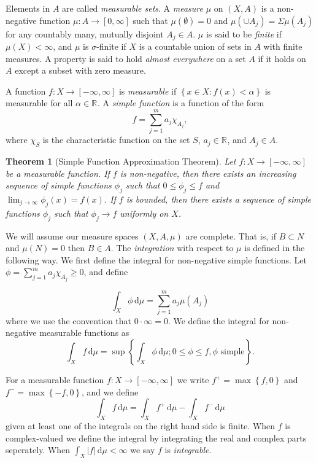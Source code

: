 \documentclass[12pt]{report}
\newtheorem{theorem}{Theorem}[section]
\numberwithin{definition}{section}
\begin{document}
Elements in $A$ are called \textit{measurable sets}.
A \textit{measure}  $\mu$ on $(X,A)$ is a non-negative function $ \mu : A \to [0,\infty] $ such that $\mu(\emptyset) = 0$ and $\mu(\cup A_{j}) = \Sigma \mu(A_{j})$ for any countably many, mutually disjoint $A_{j} \in A$.
$\mu$ is said to be  \textit{finite} if $\mu(X) < \infty$, and $\mu$ is $\sigma$-finite if $X$ is a countable union of sets in $A$ with finite measures.
A property is said to hold \textit{almost everywhere} on a set $A$ if it holds on $A$ except a subset with zero measure.

A function $ f : X \to [-\infty, \infty] $ is \textit{measurable} if $ \left\{ x \in X : f(x) < \alpha \right\}$ is measurable for all $\alpha \in \mathbb{R}^{} $.
A \textit{simple function}  is a function of the form
\[
f = \sum_{j=1}^m a_{j}\chi_{A_{j}} 
,\] 
where $\chi_{S}$ is the characteristic function on the set $S$, $a_{j} \in \mathbb{R}^{} $, and $A_{j} \in A$.

\begin{theorem}[Simple Function Approximation Theorem]
  Let $ f : X \to [-\infty, \infty] $ be a measurable function.
  If $f$ is non-negative, then there exists an increasing sequence of simple functions $\phi_{j}$ such that $0 \leq \phi_{j} \leq f$ and $\lim_{j \to \infty} \phi_{j}(x) = f(x)$.
  If $f$ is bounded, then there exists a sequence of simple functions $\phi_{j}$ such that $\phi_{j} \to f$ uniformly on $X$.
\end{theorem}

We will assume our measure spaces $(X,A,\mu)$ are complete.
That is, if $B \subset N$ and $\mu(N) = 0$ then $B \in A$.
The \textit{integration} with respect to $\mu$ is defined in the following way.
We first define the integral for non-negative simple functions.
Let $\phi = \sum_{j=1}^m a_{j} \chi_{A_{j}} \geq 0$, and define 

\[
\int_{ X} \! \phi \, \mathrm{d}\mu = \sum_{j=1}^m a_{j} \mu(A_{j})
\] 
where we use the convention that $0 \cdot \infty = 0$.
We define the integral for non-negative measurable functions as
\[
  \int_{ X} \! f \, \mathrm{d}\mu = \sup \left\{ \int_{ X} \! \phi \, \mathrm{d}\mu ; 0 \leq \phi \leq f, \phi \text{ simple}  \right\} 
.\] 

For a measurable function $ f : X \to [-\infty,\infty] $ we write $f^{+} = \max \left\{ f,0 \right\}$ and $f^{-} = \max \left\{ -f,0 \right \}$, and we define
\[
\int_{ X} \! f \, \mathrm{d}\mu = \int_{ X} \! f^{+} \, \mathrm{d}\mu - \int_{ X} \! f^{-} \, \mathrm{d}\mu  
\] 
given at least one of the integrals on the right hand side is finite.
When $f$ is complex-valued we define the integral by integrating the real and complex parts seperately.
When $\int_{ X} \! |f| \, \mathrm{d}\mu < \infty $ we say $f$ is \textit{integrable}.
\end{document}
